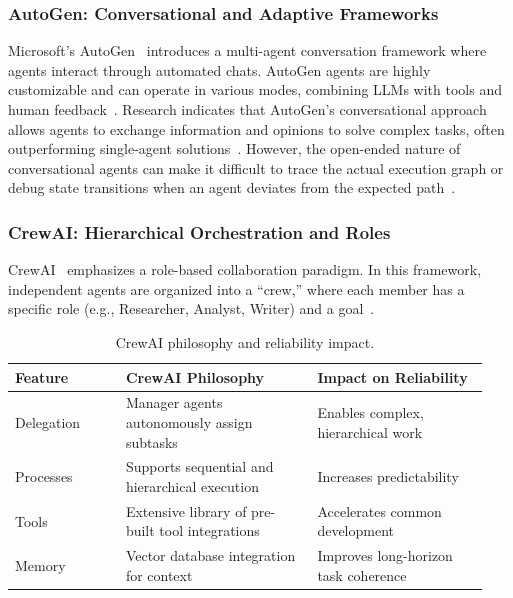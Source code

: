 \documentclass[sigconf,nonacm]{acmart}
\begin{document}
\subsubsection{AutoGen: Conversational and Adaptive Frameworks}
\label{sec:litreview:autogen}

Microsoft's AutoGen~\cite{autogen2024} introduces a multi-agent conversation
framework where agents interact through automated chats. AutoGen agents are
highly customizable and can operate in various modes, combining LLMs with
tools and human feedback~\cite{autogen2024}. Research indicates that
AutoGen's conversational approach allows agents to exchange information and
opinions to solve complex tasks, often outperforming single-agent
solutions~\cite{autogen2024}. However, the open-ended nature of
conversational agents can make it difficult to trace the actual execution
graph or debug state transitions when an agent deviates from the expected
path~\cite{crewai2024,autogen2024}.

\subsubsection{CrewAI: Hierarchical Orchestration and Roles}
\label{sec:litreview:crewai}

CrewAI~\cite{crewai2024} emphasizes a role-based collaboration paradigm. In
this framework, independent agents are organized into a ``crew,'' where each
member has a specific role (e.g., Researcher, Analyst, Writer) and a
goal~\cite{crewai2024}.

\begin{table}[t]
  \centering
  \caption{CrewAI philosophy and reliability impact.}
  \label{tab:crewai-philosophy}
  \small
  \begin{tabular}{@{}p{0.22\linewidth}p{0.38\linewidth}p{0.34\linewidth}@{}}
    \toprule
    \textbf{Feature} & \textbf{CrewAI Philosophy} & \textbf{Impact on Reliability} \\
    \midrule
    Delegation & Manager agents autonomously assign subtasks & Enables complex, hierarchical work \\
    Processes & Supports sequential and hierarchical execution & Increases predictability \\
    Tools & Extensive library of pre-built tool integrations & Accelerates common development \\
    Memory & Vector database integration for context & Improves long-horizon task coherence \\
    \bottomrule
  \end{tabular}
\end{table}
\end{document}
